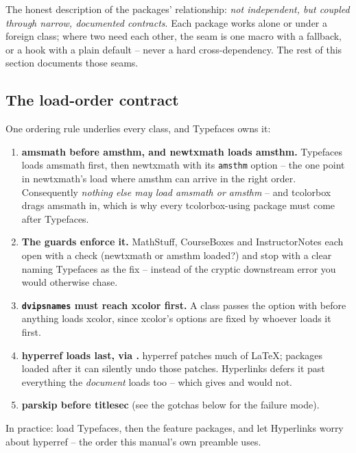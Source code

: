 The honest description of the packages' relationship: \emph{not
independent, but coupled through narrow, documented contracts}. Each
package works alone or under a foreign class; where two need each other,
the seam is one macro with a fallback, or a hook with a plain default --
never a hard cross-dependency. The rest of this section documents those
seams.

\subsection{The load-order contract}\label{sec:load-order}

One ordering rule underlies every class, and Typefaces owns it:

\begin{enumerate}
  \item \textbf{amsmath before amsthm, and newtxmath loads amsthm.}
    Typefaces loads amsmath first, then newtxmath with its
    \texttt{amsthm} option -- the one point in newtxmath's load where
    amsthm can arrive in the right order. Consequently \emph{nothing else
    may load amsmath or amsthm} -- and tcolorbox drags amsmath in, which
    is why every tcolorbox-using package must come after Typefaces.
  \item \textbf{The guards enforce it.} MathStuff, CourseBoxes and
    InstructorNotes each open with a check (newtxmath or amsthm loaded?)
    and stop with a clear  naming Typefaces as the fix
    -- instead of the cryptic downstream error you would otherwise chase.
  \item \textbf{\texttt{dvipsnames} must reach xcolor first.} A class
    passes the option with  before anything
    loads xcolor, since xcolor's options are fixed by whoever loads it
    first.
  \item \textbf{hyperref loads last, via .} hyperref
    patches much of LaTeX; packages loaded after it can silently undo
    those patches. Hyperlinks defers it past everything the
    \emph{document} loads too -- which  gives and
     would not.
  \item \textbf{parskip before titlesec} (see the gotchas below for the
    failure mode).
\end{enumerate}

In practice: load Typefaces, then the feature packages, and let
Hyperlinks worry about hyperref -- the order this manual's own preamble
uses.

